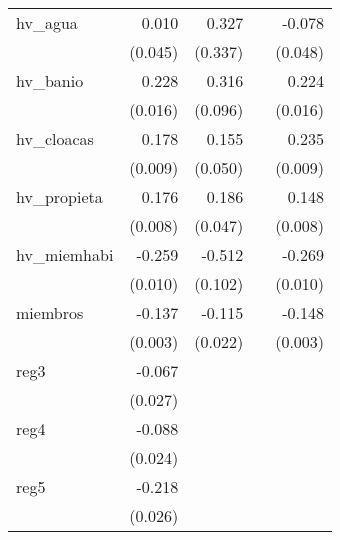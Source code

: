 {\begin{longtable}{l*{4}{D{.}{.}{-1}}}
\addlinespace
hv\_agua     &       0.010         &       0.327         &                     &      -0.078         \\
            &     (0.045)         &     (0.337)         &                     &     (0.048)         \\
\addlinespace
hv\_banio    &       0.228\sym{***}&       0.316\sym{***}&                     &       0.224\sym{***}\\
            &     (0.016)         &     (0.096)         &                     &     (0.016)         \\
\addlinespace
hv\_cloacas  &       0.178\sym{***}&       0.155\sym{**} &                     &       0.235\sym{***}\\
            &     (0.009)         &     (0.050)         &                     &     (0.009)         \\
\addlinespace
hv\_propieta &       0.176\sym{***}&       0.186\sym{***}&                     &       0.148\sym{***}\\
            &     (0.008)         &     (0.047)         &                     &     (0.008)         \\
\addlinespace
hv\_miemhabi &      -0.259\sym{***}&      -0.512\sym{***}&                     &      -0.269\sym{***}\\
            &     (0.010)         &     (0.102)         &                     &     (0.010)         \\
\addlinespace
miembros    &      -0.137\sym{***}&      -0.115\sym{***}&                     &      -0.148\sym{***}\\
            &     (0.003)         &     (0.022)         &                     &     (0.003)         \\
\addlinespace
reg3        &      -0.067\sym{*}  &                     &                     &                     \\
            &     (0.027)         &                     &                     &                     \\
\addlinespace
reg4        &      -0.088\sym{***}&                     &                     &                     \\
            &     (0.024)         &                     &                     &                     \\
\addlinespace
reg5        &      -0.218\sym{***}&                     &                     &                     \\
            &     (0.026)         &                     &                     &                     \\

\end{longtable}}
